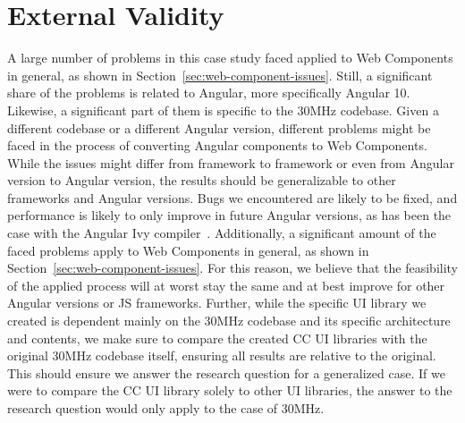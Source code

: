 \section{External Validity}
A large number of problems in this case study faced applied to Web Components in general, as shown in Section~\ref{sec:web-component-issues}. Still, a significant share of the problems is related to Angular, more specifically Angular 10. Likewise, a significant part of them is specific to the 30MHz codebase. Given a different codebase or a different Angular version, different problems might be faced in the process of converting Angular components to Web Components. While the issues might differ from framework to framework or even from Angular version to Angular version, the results should be generalizable to other frameworks and Angular versions. Bugs we encountered are likely to be fixed, and performance is likely to only improve in future Angular versions, as has been the case with the Angular Ivy compiler~. Additionally, a significant amount of the faced problems apply to Web Components in general, as shown in Section~\ref{sec:web-component-issues}. For this reason, we believe that the feasibility of the applied process will at worst stay the same and at best improve for other Angular versions or JS frameworks.
Further, while the specific UI library we created is dependent mainly on the 30MHz codebase and its specific architecture and contents, we make sure to compare the created CC UI libraries with the original 30MHz codebase itself, ensuring all results are relative to the original. This should ensure we answer the research question for a generalized case. If we were to compare the CC UI library solely to other UI libraries, the answer to the research question would only apply to the case of 30MHz.